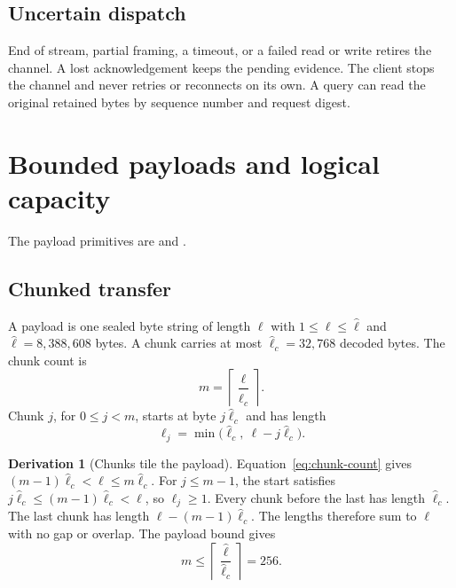 \documentclass[11pt,a4paper]{article}
\theoremstyle{definition}
\newtheorem{derivation}{Derivation}[section]
\begin{document}
\subsection{Uncertain dispatch}

End of stream, partial framing, a timeout, or a failed read or write retires the
channel. A lost acknowledgement keeps the pending evidence. The client stops the
channel and never retries or reconnects on its own. A query can read the original
retained bytes by sequence number and request digest.

\section{Bounded payloads and logical capacity}

The payload primitives are  and
.

\subsection{Chunked transfer}

A payload is one sealed byte string of length $\ell$ with $1\leq\ell\leq\hat\ell$ and
$\hat\ell=8{,}388{,}608$ bytes. A chunk carries at most $\hat\ell_c=32{,}768$ decoded
bytes. The chunk count is
\begin{equation}\label{eq:chunk-count}
m=\left\lceil\frac{\ell}{\hat\ell_c}\right\rceil.
\end{equation}
Chunk $j$, for $0\leq j<m$, starts at byte $j\hat\ell_c$ and has length
\begin{equation}\label{eq:chunk-length}
\ell_j=\min\bigl(\hat\ell_c,\ \ell-j\hat\ell_c\bigr).
\end{equation}

\begin{derivation}[Chunks tile the payload]
Equation~\eqref{eq:chunk-count} gives $(m-1)\hat\ell_c<\ell\leq m\hat\ell_c$. For
$j\leq m-1$, the start satisfies $j\hat\ell_c\leq(m-1)\hat\ell_c<\ell$, so
$\ell_j\geq1$. Every chunk before the last has length $\hat\ell_c$. The last chunk has
length $\ell-(m-1)\hat\ell_c$. The lengths therefore sum to $\ell$ with no gap or
overlap. The payload bound gives
\begin{equation}\label{eq:chunk-max}
m\leq\left\lceil\frac{\hat\ell}{\hat\ell_c}\right\rceil=256.
\end{equation}
\end{derivation}
\end{document}

